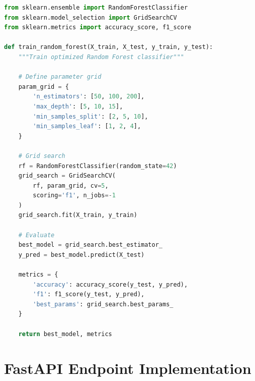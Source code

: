 \begin{lstlisting}[language=Python, caption={Classification Model Training}]
from sklearn.ensemble import RandomForestClassifier
from sklearn.model_selection import GridSearchCV
from sklearn.metrics import accuracy_score, f1_score

def train_random_forest(X_train, X_test, y_train, y_test):
    """Train optimized Random Forest classifier"""
    
    # Define parameter grid
    param_grid = {
        'n_estimators': [50, 100, 200],
        'max_depth': [5, 10, 15],
        'min_samples_split': [2, 5, 10],
        'min_samples_leaf': [1, 2, 4],
    }
    
    # Grid search
    rf = RandomForestClassifier(random_state=42)
    grid_search = GridSearchCV(
        rf, param_grid, cv=5, 
        scoring='f1', n_jobs=-1
    )
    grid_search.fit(X_train, y_train)
    
    # Evaluate
    best_model = grid_search.best_estimator_
    y_pred = best_model.predict(X_test)
    
    metrics = {
        'accuracy': accuracy_score(y_test, y_pred),
        'f1': f1_score(y_test, y_pred),
        'best_params': grid_search.best_params_
    }
    
    return best_model, metrics
\end{lstlisting}

\section{FastAPI Endpoint Implementation}

